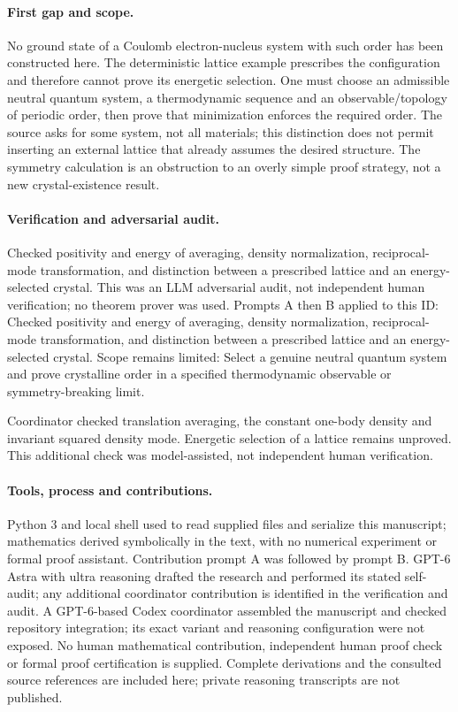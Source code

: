 \documentclass[11pt]{article}
\begin{document}
\paragraph{First gap and scope.}No ground state of a Coulomb electron-nucleus system with such order has been constructed here. The deterministic lattice example prescribes the configuration and therefore cannot prove its energetic selection. One must choose an admissible neutral quantum system, a thermodynamic sequence and an observable/topology of periodic order, then prove that minimization enforces the required order. The source asks for some system, not all materials; this distinction does not permit inserting an external lattice that already assumes the desired structure. The symmetry calculation is an obstruction to an overly simple proof strategy, not a new crystal-existence result.

\paragraph{Verification and adversarial audit.}
Checked positivity and energy of averaging, density normalization, reciprocal-mode transformation, and distinction between a prescribed lattice and an energy-selected crystal. This was an LLM adversarial audit, not independent human verification; no theorem prover was used. Prompts A then B applied to this ID: Checked positivity and energy of averaging, density normalization, reciprocal-mode transformation, and distinction between a prescribed lattice and an energy-selected crystal. Scope remains limited: Select a genuine neutral quantum system and prove crystalline order in a specified thermodynamic observable or symmetry-breaking limit.

Coordinator checked translation averaging, the constant one-body density and invariant squared density mode. Energetic selection of a lattice remains unproved. This additional check was model-assisted, not independent human verification.

\paragraph{Tools, process and contributions.}
Python 3 and local shell used to read supplied files and serialize this manuscript; mathematics derived symbolically in the text, with no numerical experiment or formal proof assistant. Contribution prompt A was followed by prompt B. GPT-6 Astra with ultra reasoning drafted the research and performed its stated self-audit; any additional coordinator contribution is identified in the verification and audit. A GPT-6-based Codex coordinator assembled the manuscript and checked repository integration; its exact variant and reasoning configuration were not exposed. No human mathematical contribution, independent human proof check or formal proof certification is supplied. Complete derivations and the consulted source references are included here; private reasoning transcripts are not published.
\end{document}
